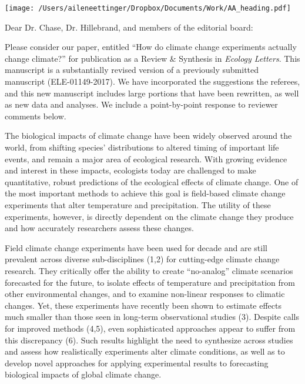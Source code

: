 \documentclass[11pt,a4paper]{letter}
\begin{document}


\begin{letter}{}
\texttt{[image: /Users/aileneettinger/Dropbox/Documents/Work/AA\_heading.pdf]}

\opening{Dear Dr. Chase, Dr. Hillebrand, and members of the editorial board:}
Please consider our paper, entitled ``How do climate change experiments actually change climate?'' for publication as a Review \& Synthesis in \emph{Ecology Letters}. This manuscript is a substantially revised version of a previously submitted manuscript  (ELE-01149-2017). We have incorporated the suggestions the referees, and this new manuscript includes large portions that have been rewritten, as well as new data and analyses. We include a point-by-point response to reviewer comments below.

The biological impacts of climate change have been widely observed around the world, from shifting species' distributions to altered timing of important life events, and remain a major area of ecological research. With growing evidence and interest in these impacts, ecologists today are challenged to make quantitative, robust predictions of the ecological effects of climate change. One of the most important methods to achieve this goal is field-based climate change experiments that alter temperature and precipitation. The utility of these experiments, however, is directly dependent on the climate change they produce and how accurately researchers assess these changes. 

Field climate change experiments have been used for decade and are still prevalent across diverse sub-disciplines  (1,2) %
for cutting-edge climate change research. They critically offer the ability to create ``no-analog'' climate scenarios forecasted for the future, to isolate effects of temperature and precipitation from other environmental changes, and to examine non-linear responses to climatic changes. Yet, these experiments have recently been shown to estimate effects much smaller than those seen in long-term observational studies (3). %
Despite calls for improved methods (4,5), %
even sophisticated approaches appear to suffer from this discrepancy (6). %
Such results highlight the need to synthesize across studies and assess how realistically experiments alter climate conditions, as well as to develop novel approaches for applying experimental results to forecasting biological impacts of global climate change. 


\end{letter}
\end{document}
